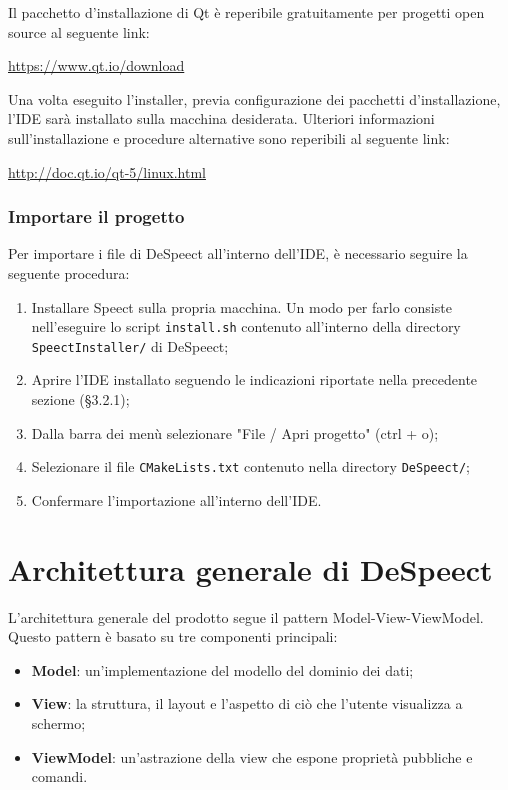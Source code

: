 \documentclass[openany,12pt,a4paper]{report}
\begin{document}
	Il pacchetto d'installazione di Qt è reperibile gratuitamente per progetti open source al seguente link:
	\begin{center}
		\url{https://www.qt.io/download}
	\end{center}
	
	\noindent Una volta eseguito l'installer, previa configurazione dei pacchetti d'installazione, l'IDE sarà installato sulla macchina desiderata. Ulteriori informazioni sull'installazione e procedure alternative sono reperibili al seguente link:
	\begin{center}
		\url{http://doc.qt.io/qt-5/linux.html}
	\end{center} 
	
	\subsection{Importare il progetto}  
	
	Per importare i file di DeSpeect all'interno dell'IDE, è necessario seguire la seguente procedura:
	\begin{enumerate}
		\item Installare Speect sulla propria macchina. Un modo per farlo consiste nell'eseguire lo script \verb|install.sh| contenuto all'interno della directory \verb|SpeectInstaller/| di DeSpeect;
		\item Aprire l'IDE installato seguendo le indicazioni riportate nella precedente sezione (§3.2.1);
		\item Dalla barra dei menù selezionare "File / Apri progetto" (ctrl + o);
		\item Selezionare il file \verb|CMakeLists.txt| contenuto nella directory \verb|DeSpeect/|;
		\item Confermare l'importazione all'interno dell'IDE.
	\end{enumerate}
	

\chapter{Architettura generale di DeSpeect}

L'architettura generale del prodotto segue il pattern Model-View-ViewModel. Questo pattern è basato su tre componenti principali:

\begin{itemize}
	\item \textbf{Model}: un'implementazione del modello del dominio dei dati;
	\item \textbf{View}: la struttura, il layout e l'aspetto di ciò che l'utente visualizza a schermo;
	\item \textbf{ViewModel}: un'astrazione della view che espone proprietà pubbliche e comandi.
\end{itemize}
\end{document}
